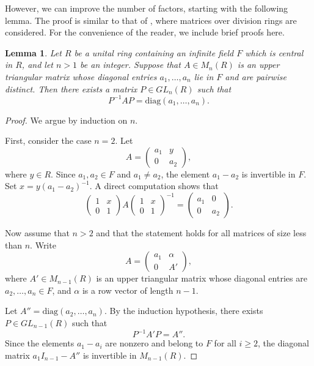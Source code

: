 \documentclass{amsart}
\newtheorem{lemma}[theorem]{Lemma}
\theoremstyle{definition}
\begin{document}
However, we can improve the number of factors, starting with the following lemma.  The proof is similar to that of \cite[Lemma 2.1]{MR4815128}, where matrices over division rings are considered. For the convenience of the reader, we include brief proofs here.


\begin{lemma}\label{BiSo}
	Let $R$ be a unital ring containing an infinite field $F$ which is central in $R$, and let $n>1$ be an integer.
	Suppose that $A\in M_n(R)$ is an upper triangular matrix whose diagonal entries
	$a_1,\ldots,a_n$ lie in $F$ and are pairwise distinct.
	Then there exists a matrix $P\in GL_n(R)$ such that
	\[
	P^{-1}AP=\mathrm{diag}(a_1,\ldots,a_n).
	\]
\end{lemma}

\begin{proof}
	We argue by induction on $n$.
	
	First, consider the case $n=2$. Let
	\[
	A=\begin{pmatrix}
		a_1 & y\\
		0 & a_2
	\end{pmatrix},
	\]
	where $y\in R$.
	Since $a_1,a_2\in F$ and $a_1\neq a_2$, the element $a_1-a_2$ is invertible in $F$.
	Set $x=y(a_1-a_2)^{-1}$.
	A direct computation shows that
	\[
	\begin{pmatrix}
		1 & x\\
		0 & 1
	\end{pmatrix}
	A
	\begin{pmatrix}
		1 & x\\
		0 & 1
	\end{pmatrix}^{-1}
	=
	\begin{pmatrix}
		a_1 & 0\\
		0 & a_2
	\end{pmatrix}.
	\]
	
	Now assume that $n>2$ and that the statement holds for all matrices of size less than $n$.
	Write
	\[
	A=\begin{pmatrix}
		a_1 & \alpha\\
		0 & A'
	\end{pmatrix},
	\]
	where $A'\in M_{n-1}(R)$ is an upper triangular matrix whose diagonal entries
	are $a_2,\ldots,a_n\in F$, and $\alpha$ is a row vector of length $n-1$.
	
	Let $A''=\mathrm{diag}(a_2,\ldots,a_n)$.
	By the induction hypothesis, there exists $P\in GL_{n-1}(R)$ such that
	\[
	P^{-1}A'P=A''.
	\]
	Since the elements $a_1-a_i$ are nonzero and belong to $F$ for all $i\ge2$,
	the diagonal matrix $a_1 I_{n-1}-A''$ is invertible in $M_{n-1}(R)$.
	

\end{proof}
\end{document}
